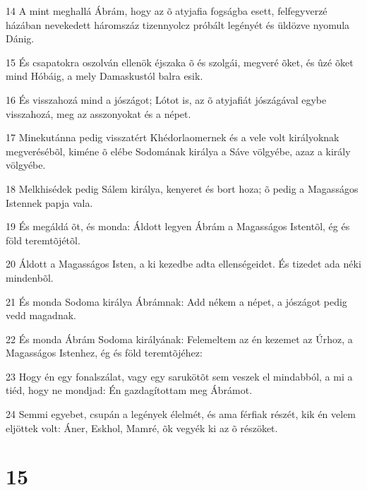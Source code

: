 \par 14 A mint meghallá Ábrám, hogy az õ atyjafia fogságba esett, felfegyverzé házában nevekedett háromszáz tizennyolcz próbált legényét és üldözve nyomula Dánig.
\par 15 És csapatokra oszolván ellenök éjszaka õ és szolgái, megveré õket, és ûzé õket mind Hóbáig, a mely Damaskustól balra esik.
\par 16 És visszahozá mind a jószágot; Lótot is, az õ atyjafiát jószágával egybe visszahozá, meg az asszonyokat és a népet.
\par 17 Minekutánna pedig visszatért Khédorlaomernek és a vele volt királyoknak megverésébõl, kiméne õ elébe Sodomának királya a Sáve völgyébe, azaz a király völgyébe.
\par 18 Melkhisédek pedig Sálem királya, kenyeret és bort hoza; õ pedig a Magasságos Istennek papja vala.
\par 19 És megáldá õt, és monda: Áldott legyen Ábrám a Magasságos Istentõl, ég és föld teremtõjétõl.
\par 20 Áldott a Magasságos Isten, a ki kezedbe adta ellenségeidet. És tizedet ada néki mindenbõl.
\par 21 És monda Sodoma királya Ábrámnak: Add nékem a népet, a jószágot pedig vedd magadnak.
\par 22 És monda Ábrám Sodoma királyának: Felemeltem az én kezemet az Úrhoz, a Magasságos Istenhez, ég és föld teremtõjéhez:
\par 23 Hogy én egy fonalszálat, vagy egy sarukötõt sem veszek el mindabból, a mi a tiéd, hogy ne mondjad: Én gazdagítottam meg Ábrámot.
\par 24 Semmi egyebet, csupán a legények élelmét, és ama férfiak részét, kik én velem eljöttek volt: Áner, Eskhol, Mamré, õk vegyék ki az õ részöket.

\chapter{15}


